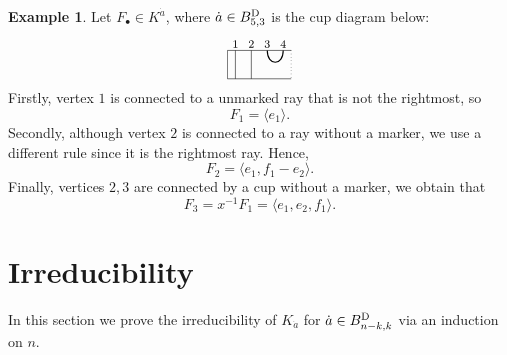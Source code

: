 \documentclass[11pt,reqno]{amsart}
\numberwithin{equation}{section}
\theoremstyle{definition}
\newtheorem{ex}[theorem]{Example}
\def\<{\langle}
\def\>{\rangle}
\newcommand{\BD}{{B}^\textup{D}}
\newcommand{\da}{\dot{a}}
\newcommand{\inv}{^{-1}}
\begin{document}
\begin{ex}\label{ex:||U}
Let $F_\bullet \in K^{\da}$, where $\da \in \BD_{5,3}$ is the cup diagram below:
\[
\begin{tikzpicture}[baseline={(0,-.3)}, scale = 0.8]
\draw  (1.75,0) -- (-.25,0)  -- (-.25,-.9)--(1.75,-.9);
\draw[dotted] (1.75,0) -- (1.75,-.9);
\begin{footnotesize}
\node at (0,.2) {$1$};
\node at (.5,.2) {$2$};
\node at (1,.2) {$3$};
\node at (1.5,.2) {$4$};
\end{footnotesize}
\draw[thick] (1,0) .. controls +(0,-.5) and +(0,-.5) .. +(.5,0);
\draw (0,0) -- (0,-.9);
\draw (0.5,0) -- (0.5,-.9);
\end{tikzpicture}
\]
Firstly, vertex $1$ is connected to a unmarked ray that is not the rightmost, so 
\[
F_1=\langle e_1 \rangle.
\]
Secondly, although vertex $2$ is connected to a ray without a marker, we use a different rule since it is the rightmost ray. Hence, 
\[
F_2=\langle e_1, f_1 - e_2\rangle.
\]
Finally, vertices $2, 3$ are connected by a cup without a marker, we obtain that 
\[
F_{3}=x\inv F_{1} = \<e_1, e_2, f_1\>.
\]
\end{ex}


\section{Irreducibility}\label{sec:irred}
In this section we prove the irreducibility of $K_{\da}$ for $\da \in B^\textup{D}_{n-k,k}$ via an induction on $n$. 
\end{document}
